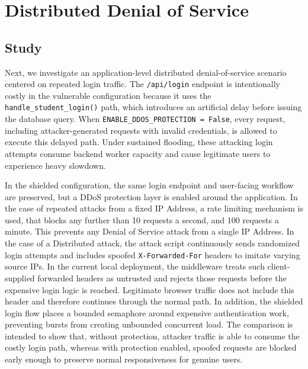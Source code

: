 \documentclass[11pt,a4paper]{article}
\begin{document}
\section{Distributed Denial of Service}

\subsection{Study}

Next, we investigate an application-level distributed denial-of-service scenario centered on repeated login traffic. The \texttt{/api/login} endpoint is intentionally costly in the vulnerable configuration because it uses the \texttt{handle\_student\_login()} path, which introduces an artificial delay before issuing the database query. When \texttt{ENABLE\_DDOS\_PROTECTION = False}, every request, including attacker-generated requests with invalid credentials, is allowed to execute this delayed path. Under sustained flooding, these attacking login attempts consume backend worker capacity and cause legitimate users to experience heavy slowdown.

In the shielded configuration, the same login endpoint and user-facing workflow are preserved, but a DDoS protection layer is enabled around the application. In the case of repeated attacks from a fixed IP Address, a rate limiting mechanism is used, that blocks any further than 10 requests a second, and 100 requests a minute. This prevents any Denial of Service attack from a single IP Address. In the case of a Distributed attack, the attack script continuously sends randomized login attempts and includes spoofed \texttt{X-Forwarded-For} headers to imitate varying source IPs. In the current local deployment, the middleware treats such client-supplied forwarded headers as untrusted and rejects those requests before the expensive login logic is reached. Legitimate browser traffic does not include this header and therefore continues through the normal path. In addition, the shielded login flow places a bounded semaphore around expensive authentication work, preventing bursts from creating unbounded concurrent load. The comparison is intended to show that, without protection, attacker traffic is able to consume the costly login path, whereas with protection enabled, spoofed requests are blocked early enough to preserve normal responsiveness for genuine users.
\end{document}
